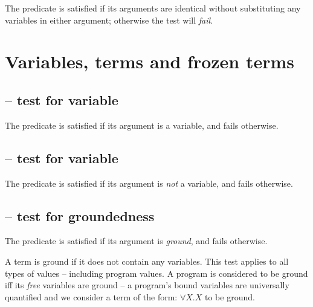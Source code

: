 \synopsis{==}{[t,t]\{\}}

The \q{==} predicate is satisfied if its arguments are identical without substituting any variables in either argument; otherwise the \q{==} test will \emph{fail}.

\section{Variables, terms and frozen terms}
\label{misc:varterms}

\subsection{ -- test for variable}
\label{misc:var}


The  predicate is satisfied if its argument is a variable, and fails otherwise. 

\subsection{ -- test for variable}
\label{misc:nonvar}


The  predicate is satisfied if its argument is \emph{not} a variable, and fails otherwise. 


\subsection{ -- test for groundedness}
\label{misc:ground}


The  predicate is satisfied if its argument is \emph{ground}, and fails otherwise. 

A term is ground if it does not contain any variables. This test applies to all types of values -- including program values. A program is considered to be ground iff its \emph{free} variables are ground -- a program's bound variables are universally quantified and we consider a term of the form: $\forall X.X$ to be ground.



